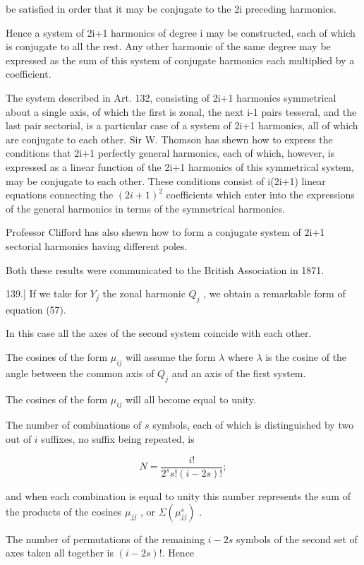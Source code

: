 \documentclass[11pt,a4paper]{article}
\begin{document}
be satisfied in order that it may be conjugate to the 2i preceding harmonics.

Hence a system of 2i+1 harmonics of degree i may be constructed, each of which is conjugate to all the rest. Any other harmonic of the same degree may be expressed as the sum of this system of conjugate harmonics each multiplied by a coefficient.

The system described in Art. 132, consisting of 2i+1 harmonics symmetrical about a single axis, of which the first is zonal, the next i-1 pairs tesseral, and the last pair sectorial, is a particular case of a system of 2i+1 harmonics, all of which are conjugate to each other. Sir W. Thomson has shewn how to express the conditions that 2i+1 perfectly general harmonics, each of which, however, is expressed as a linear function of the 2i+1 harmonics of this symmetrical system, may be conjugate to each other. These conditions consist of i(2i+1) linear equations connecting the  $(2i+1)^2$  coefficients which enter into the expressions of the general harmonics in terms of the symmetrical harmonics.

Professor Clifford has also shewn how to form a conjugate system of 2i+1 sectorial harmonics having different poles.

Both these results were communicated to the British Association in 1871.

139.] If we take for  $Y_j$  the zonal harmonic  $Q_j$ , we obtain a remarkable form of equation (57).

In this case all the axes of the second system coincide with each other.

The cosines of the form  $\mu_{ij}$  will assume the form  $\lambda$  where  $\lambda$  is the cosine of the angle between the common axis of  $Q_j$  and an axis of the first system.

The cosines of the form  $\mu_{ij}$  will all become equal to unity.

The number of combinations of $s$ symbols, each of which is distinguished by two out of $i$ suffixes, no suffix being repeated, is

\begin{equation}\tag{58}
N=\frac{i!}{2^s s!(i-2s)!};
\end{equation}

and when each combination is equal to unity this number represents the sum of the products of the cosines  $\mu_{jj}$ , or  $\Sigma(\mu_{jj}^s)$ .

The number of permutations of the remaining $i-2s$ symbols of the second set of axes taken all together is $(i-2s)!$. Hence
\end{document}
